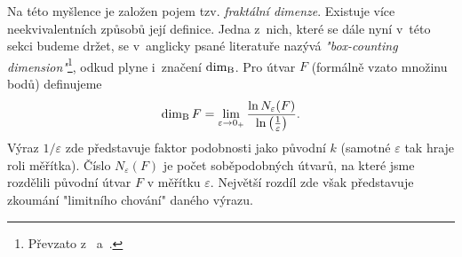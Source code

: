Na této myšlence je založen pojem tzv. \emph{fraktální dimenze}. Existuje více neekvivalentních způsobů její definice. Jedna z~nich, které se dále nyní v~této sekci budeme držet, se v~anglicky psané literatuře nazývá \emph{"box-counting dimension"}\footnote{Převzato z~\cite[str. 93]{Zelinka2006} a~\cite[str. 28]{Falconer2014}.}, odkud plyne i~značení $\operatorname{dim_B}$. Pro útvar $F$ (formálně vzato množinu bodů) definujeme 
\begin{equation}\label{eq:fraktalni-dimenze}
    \operatorname{dim_B}{F}=\lim_{\varepsilon\to 0_+}{\dfrac{\ln{N_\varepsilon(F)}}{\ln{\left(\frac{1}{\varepsilon}\right)}}}.
\end{equation}
Výraz $1/\varepsilon$ zde představuje faktor podobnosti jako původní $k$ (samotné $\varepsilon$ tak hraje roli měřítka). Číslo $N_\varepsilon(F)$ je počet soběpodobných útvarů, na které jsme rozdělili původní útvar $F$ v měřítku $\varepsilon$. Největší rozdíl zde však představuje zkoumání "limitního chování" daného výrazu.

